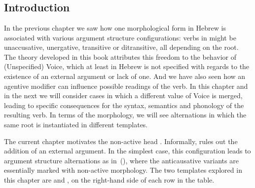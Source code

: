 \chapter{\vz}
\label{chap:vz}

\section{Introduction} \label{vz:intro}
In the previous chapter we saw how one morphological form in Hebrew is associated with various argument structure configurations: verbs in {\tkal} might be unaccusative, unergative, transitive or ditransitive, all depending on the root. The theory developed in this book attributes this freedom to the behavior of (Unspecified) Voice, which at least in Hebrew is not specified with regards to the existence of an external argument or lack of one. And we have also seen how an agentive modifier can influence possible readings of the verb. In this chapter and in the next we will consider cases in which a different value of Voice is merged, leading to specific consequences for the syntax, semantics and phonology of the resulting verb. In terms of the morphology, we will see alternations in which the same root is instantiated in different templates.

The current chapter motivates the non-active head {\vz}. Informally, {\vz} rules out the addition of an external argument. In the simplest case, this configuration leads to argument structure alternations as in~(\nextx), where the anticausative variants are essentially marked with non-active morphology. The two templates explored in this chapter are {\tnif} and {\thit}, on the right-hand side of each row in the table.
\ex\label{ex:anticaus}
\xe

